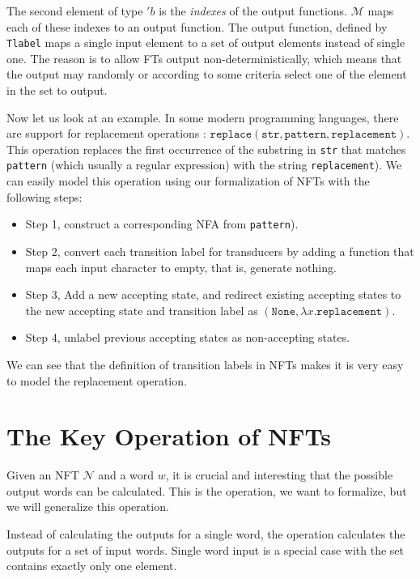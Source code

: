 \documentclass[a4paper,UKenglish,cleveref, autoref, thm-restate]{lipics-v2021}
\begin{document}
The second element of type $'b$ is the \emph{indexes} of the output functions.  $\mathcal{M}$ maps each of these indexes to an output function. The output function, defined by \texttt{Tlabel} maps a single input element to a set of output elements instead of single one. The reason is to allow FTs output non-deterministically, which means that the output may randomly or according to some criteria select one of the element in the set to output.

Now let us look at an example. In some modern programming languages, there are support for replacement operations : $\texttt{replace}(\texttt{str}, \texttt{pattern}, \texttt{replacement})$. This operation replaces the first occurrence of the substring  in \texttt{str} that matches \texttt{pattern} (which usually a regular expression) with the string \texttt{replacement}). 
We can easily model this operation using our formalization of NFTs with the following steps:
\begin{itemize}
\item Step 1, construct a corresponding NFA from \texttt{pattern}).
\item Step 2, convert each transition label for transducers by adding a function that maps each input character to empty, that is, generate nothing.
\item Step 3, Add a new accepting state, and redirect existing accepting states to the new accepting state and transition label as $(\texttt{None}, \lambda x. \texttt{replacement})$.
\item Step 4, unlabel previous accepting states as non-accepting states. 
\end{itemize}

We can see that the definition of transition labels in NFTs makes it is very easy to model the replacement operation.

\section{The Key Operation of NFTs}
\label{sec-form-fts}

Given an NFT $\mathcal{N}$ and a word $w$, it is crucial and interesting that the possible output words can be calculated. This is the operation, we want to formalize, but we will generalize this operation.

Instead of calculating the outputs for a single word, the operation calculates the outputs for a set of input words. Single word input is a special case with the set contains exactly only one element.
\end{document}
